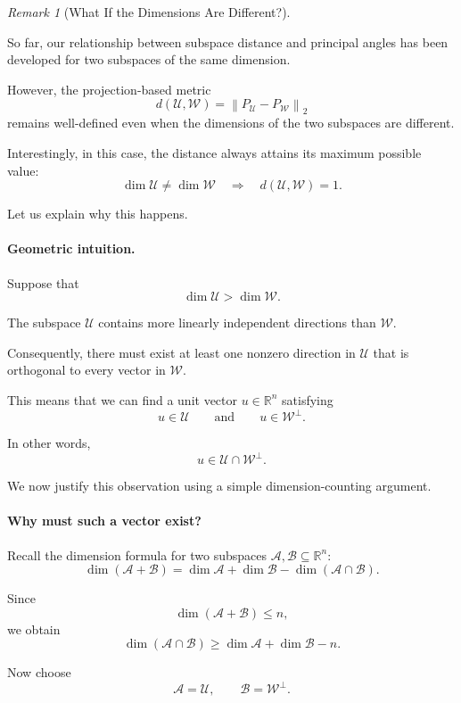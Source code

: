 \documentclass[14pt,letterpaper]{article}
\theoremstyle{plain}
\theoremstyle{definition}
\theoremstyle{remark}
\newtheorem{remark}[theorem]{Remark}
\newcommand{\R}{\mathbb{R}}
\newcommand{\norm}[1]{\left\lVert #1 \right\rVert}
\begin{document}
\begin{remark}[What If the Dimensions Are Different?]
\label{rem:different_subspace_dimensions}

So far, our relationship between subspace distance
and principal angles has been developed for two
subspaces of the same dimension.

However, the projection-based metric
\[
d(\mathcal U,\mathcal W)
=
\norm{P_{\mathcal U}-P_{\mathcal W}}_2
\]
remains well-defined even when the dimensions of
the two subspaces are different.

Interestingly, in this case, the distance
always attains its maximum possible value:
\[
\boxed{
\dim\mathcal U\neq\dim\mathcal W
\quad\Longrightarrow\quad
d(\mathcal U,\mathcal W)=1.
}
\]

Let us explain why this happens.

\paragraph{Geometric intuition.}

Suppose that
\[
\dim\mathcal U>\dim\mathcal W.
\]

The subspace $\mathcal U$ contains more linearly
independent directions than $\mathcal W$.

Consequently, there must exist at least one
nonzero direction in $\mathcal U$ that is
orthogonal to every vector in $\mathcal W$.

This means that we can find a unit vector
$u\in\R^n$ satisfying
\[
\boxed{
u\in\mathcal U
\qquad\text{and}\qquad
u\in\mathcal W^\perp.
}
\]

In other words,
\[
\boxed{
u\in\mathcal U\cap\mathcal W^\perp.
}
\]

We now justify this observation using a
simple dimension-counting argument.

\paragraph{Why must such a vector exist?}

Recall the dimension formula for two
subspaces $\mathcal A,\mathcal B\subseteq\R^n$:
\[
\dim(\mathcal A+\mathcal B)
=
\dim\mathcal A+\dim\mathcal B
-\dim(\mathcal A\cap\mathcal B).
\]

Since
\[
\dim(\mathcal A+\mathcal B)\leq n,
\]
we obtain
\[
\boxed{
\dim(\mathcal A\cap\mathcal B)
\geq
\dim\mathcal A+\dim\mathcal B-n.
}
\]

Now choose
\[
\mathcal A=\mathcal U,
\qquad
\mathcal B=\mathcal W^\perp.
\]


\end{remark}
\end{document}
